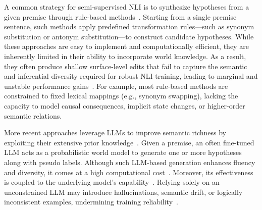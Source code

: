 \documentclass[lettersize,journal]{IEEEtran}
\begin{document}
A common strategy for semi-supervised NLI is to synthesize hypotheses from a given premise through rule-based methods~\cite{DBLP:conf/acl/VarshneyBGB22}. Starting from a single premise sentence, such methods apply predefined transformation rules—such as synonym substitution or antonym substitution—to construct candidate hypotheses. While these approaches are easy to implement and computationally efficient, they are inherently limited in their ability to incorporate world knowledge. As a result, they often produce shallow surface-level edits that fail to capture the semantic and inferential diversity required for robust NLI training, leading to marginal and unstable performance gains~\cite{feng-etal-2021-survey,choi-etal-2024-autoaugment,han-etal-2025-rule}. For example, most rule-based methods are constrained to fixed lexical mappings (e.g., synonym swapping), lacking the capacity to model causal consequences, implicit state changes, or higher-order semantic relations.

More recent approaches leverage LLMs to improve semantic richness by exploiting their extensive prior knowledge~\cite{DBLP:conf/emnlp/SadatC22a,DBLP:conf/emnlp/ParkC24}. Given a premise, an often fine-tuned LLM acts as a probabilistic world model to generate one or more hypotheses along with pseudo labels. Although such LLM-based generation enhances fluency and diversity, it comes at a high computational cost~\cite{feng-etal-2021-survey}. Moreover, its effectiveness is coupled to the underlying model's capability~\cite{DBLP:journals/corr/abs-2202-07136}. Relying solely on an unconstrained LLM may introduce hallucinations, semantic drift, or logically inconsistent examples, undermining training reliability~\cite{mckenna-etal-2023-sources}.

\end{document}
